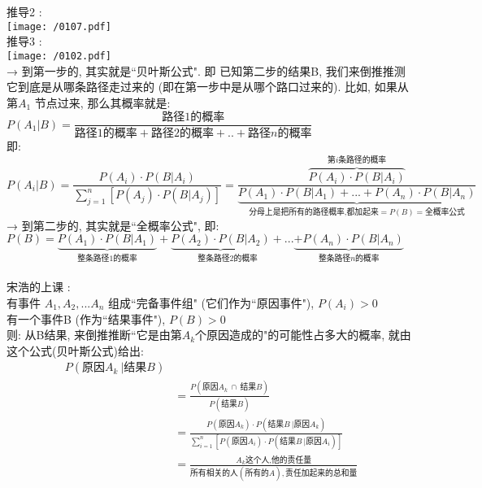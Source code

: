 \documentclass[UTF8]{ctexart}
\begin{document}
推导2 : \\
\texttt{[image: /0107.pdf]} \\




推导3 : \\
\texttt{[image: /0102.pdf]} \\

→ 到第一步的, 其实就是``贝叶斯公式". 即 已知第二步的结果B, 我们来倒推推测它到底是从哪条路径走过来的 (即在第一步中是从哪个路口过来的). 比如, 如果从第$ A_1$ 节点过来, 那么其概率就是:$
P\left( A_1|B \right) =\dfrac{\text{路径1的概率}}{\text{路径1的概率}+\text{路径2的概率}+..+\text{路径}n\text{的概率}}
$ \\
即: \\
$
P\left( A_i|B \right) =\dfrac{P(A_i)\cdot P(B|A_i)}{\sum_{j=1}^n{\left[ P(A_j)\cdot P(B|A_j) \right]}}=\dfrac{\overset{\text{第}i\text{条路径的概率}}{\overbrace{P(A_i)\cdot P(B|A_i)}}}{\underset{\text{分母上是把所有的路径概率,都加起来}=P(B)=\text{全概率公式}}{\underbrace{P(A_1)\cdot P(B|A_1)+...+P(A_n)\cdot P(B|A_n)}}}
$ \\

→ 到第二步的, 其实就是``全概率公式", 即: \\
$
P(B)=\underset{\text{整条路径1的概率}}{\underbrace{P(A_1)\cdot P(B|A_1)}}+\underset{\text{整条路径2的概率}}{\underbrace{P(A_2)\cdot P(B|A_2)}+}...\underset{\text{整条路径}n\text{的概率}}{\underbrace{+P(A_n)\cdot P(B|A_n)}}
$ \\
~\\



宋浩的上课 : \\
有事件 $A_1, A_2, ... A_n$ 组成``完备事件组" (它们作为``原因事件"), $P(A_i) > 0$ \\
有一个事件B (作为``结果事件"), $P(B) > 0$ \\

则: 从B结果, 来倒推推断``它是由第$A_k$个原因造成的"的可能性占多大的概率, 就由这个公式(贝叶斯公式)给出: \\
\begin{align*}  %
	P(\text{原因}A_k\ |\text{结果}B)\\
&=\frac{P(\text{原因}A_k\ \cap \ \text{结果}B)}{P(\text{结果}B)}\\
&=\frac{P\left( \text{原因}A_k \right) \cdot P\left( \text{结果}B\ |\text{原因}A_k \right)}{\sum_{i=1}^n{\left[ P\left( \text{原因}A_i \right) \cdot P\left( \text{结果}B\ |\text{原因}A_i \right) \right]}}\\
&=\frac{A_k\text{这个人,他的责任量}}{\text{所有相关的人}(\text{所有的}A),\text{责任加起来的总和量}} 
\end{align*}
\\
\end{document}
